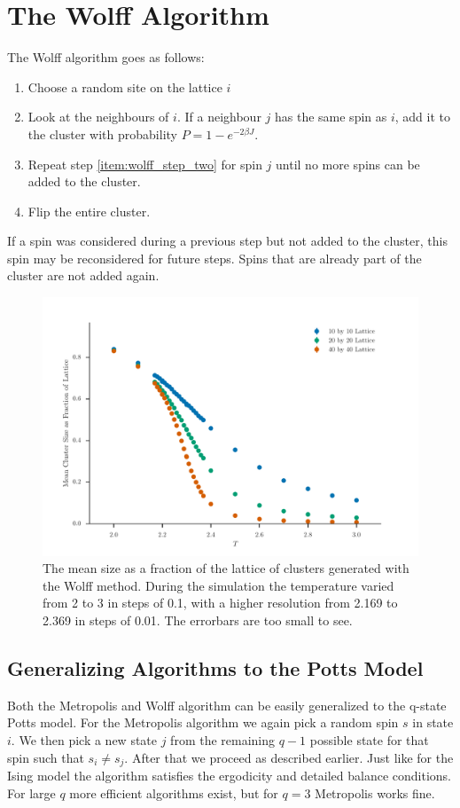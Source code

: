 \documentclass[11pt, a4paper]{report} %
\begin{document}
\section{The Wolff Algorithm}
The Wolff algorithm goes as follows:
\begin{enumerate}
	\item Choose a random site on the lattice \(i\)
	\item \label{item:wolff_step_two} Look at the neighbours of \(i\). If a neighbour \(j\) has the same spin as \(i\), add it to the cluster with probability \(P = 1 - e^{-2\beta J}\).
	\item Repeat step \ref{item:wolff_step_two} for spin \(j\) until no more spins can be added to the cluster.
	\item Flip the entire cluster.
\end{enumerate}
If a spin was considered during a previous step but not added to the cluster, this spin may be reconsidered for future steps.
Spins that are already part of the cluster are not added again.\cite{newman:1999}
\begin{figure}[h]
	\centering
	\includegraphics[width=\textwidth]{wolff_mean_cluster_size_as_fraction_of_lattice.pdf}
	\caption{The mean size as a fraction of the lattice of clusters generated with the Wolff method. During the simulation the temperature varied from 2 to 3 in steps of 0.1, with a higher resolution from 2.169 to 2.369 in steps of 0.01. The errorbars are too small to see.}
\end{figure}

\subsection{Generalizing Algorithms to the Potts Model}
Both the Metropolis and Wolff algorithm can be easily generalized to the q-state Potts model.
For the Metropolis algorithm we again pick a random spin \(s\) in state \(i\).
We then pick a new state \(j\) from the remaining \(q-1\) possible state for that spin such that \(s_i \neq s_j\).
After that we proceed as described earlier.
Just like for the Ising model the algorithm satisfies the ergodicity and detailed balance conditions.
For large \(q\) more efficient algorithms exist, but for \(q=3\) Metropolis works fine.
\end{document}
